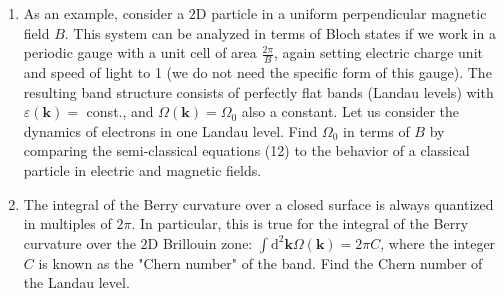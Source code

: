 \documentclass[hyperref, a4paper]{article}
\begin{document}
\begin{enumerate}
    \item As an example, consider a $2 \mathrm{D}$ particle in a uniform perpendicular magnetic field $B$. This system can be analyzed in terms of Bloch states if we work in a periodic gauge with a unit cell of area $\frac{2 \pi}{B}$, again setting electric charge unit and speed of light to 1 (we do not need the specific form of this gauge). The resulting band structure consists of perfectly flat bands (Landau levels) with $\varepsilon(\mathbf{k})=$ const., and $\Omega(\mathbf{k})=\Omega_0$ also a constant. Let us consider the dynamics of electrons in one Landau level. Find $\Omega_0$ in terms of $B$ by comparing the semi-classical equations (12) to the behavior of a classical particle in electric and magnetic fields.
    \item The integral of the Berry curvature over a closed surface is always quantized in multiples of $2 \pi$. In particular, this is true for the integral of the Berry curvature over the $2 \mathrm{D}$ Brillouin zone: $\int \mathrm{d}^2 \mathbf{k} \Omega(\mathbf{k})=2 \pi C$, where the integer $C$ is known as the "Chern number" of the band. Find the Chern number of the Landau level.
\end{enumerate}
\end{document}
